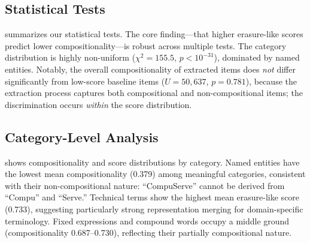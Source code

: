 \subsection{Statistical Tests}
\label{sec:results:stats}

 summarizes our statistical tests.
The core finding---that higher erasure-like scores predict lower compositionality---is robust across multiple tests.
The category distribution is highly non-uniform ($\chi^2 = 155.5$, $p < 10^{-31}$), dominated by named entities.
Notably, the overall compositionality of extracted items does \emph{not} differ significantly from low-score baseline items ($U = 50{,}637$, $p = 0.781$), because the extraction process captures both compositional and non-compositional items; the discrimination occurs \emph{within} the score distribution.

\begin{table}[t]
    \centering
    \caption{Statistical tests. All tests use $\alpha = 0.05$.}
    \label{tab:stats}
\end{table}

\subsection{Category-Level Analysis}
\label{sec:results:category}

 shows compositionality and score distributions by category.
Named entities have the lowest mean compositionality (0.379) among meaningful categories, consistent with their non-compositional nature: ``CompuServe'' cannot be derived from ``Compu'' and ``Serve.''
Technical terms show the highest mean erasure-like score (0.733), suggesting particularly strong representation merging for domain-specific terminology.
Fixed expressions and compound words occupy a middle ground (compositionality 0.687--0.730), reflecting their partially compositional nature.

